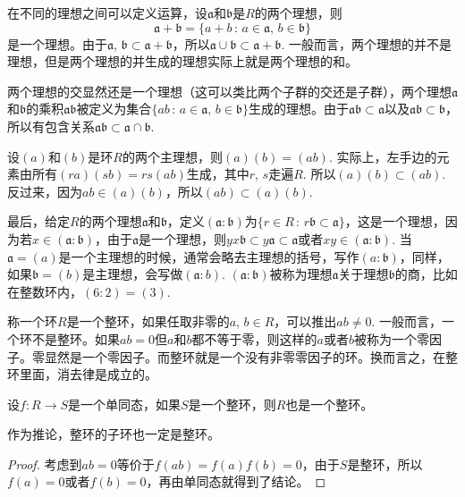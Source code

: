 \para[理想的运算] 在不同的理想之间可以定义运算，设$\mathfrak{a}$和$\mathfrak{b}$是$R$的两个理想，则
\[
\mathfrak{a}+\mathfrak{b}=\{a+b\,:\,a\in\mathfrak{a},\,b\in\mathfrak{b}\}
\]
是一个理想。由于$\mathfrak{a}$, $\mathfrak{b}\subset \mathfrak{a}+\mathfrak{b}$，所以$\mathfrak{a}\cup\mathfrak{b}\subset \mathfrak{a}+\mathfrak{b}$. 一般而言，两个理想的并不是理想，但是两个理想的并生成的理想实际上就是两个理想的和。

两个理想的交显然还是一个理想（这可以类比两个子群的交还是子群），两个理想$\mathfrak{a}$和$\mathfrak{b}$的乘积$\mathfrak{a}\mathfrak{b}$被定义为集合$\{ab\,:\,a\in\mathfrak{a},\,b\in\mathfrak{b}\}$生成的理想。由于$\mathfrak{a}\mathfrak{b}\subset \mathfrak{a}$以及$\mathfrak{a}\mathfrak{b}\subset \mathfrak{b}$，所以有包含关系$\mathfrak{a}\mathfrak{b}\subset \mathfrak{a}\cap \mathfrak{b}$.

设$(a)$和$(b)$是环$R$的两个主理想，则$(a)(b)=(ab)$. 实际上，左手边的元素由所有$(ra)(sb)=rs(ab)$生成，其中$r$, $s$走遍$R$. 所以$(a)(b)\subset (ab)$. 反过来，因为$ab\in (a)(b)$，所以$(ab)\subset (a)(b)$.

最后，给定$R$的两个理想$\mathfrak{a}$和$\mathfrak{b}$，定义$(\mathfrak{a}:\mathfrak{b})$为$\{r\in R\,:\, r\mathfrak{b}\subset \mathfrak{a}\}$，这是一个理想，因为若$x\in (\mathfrak{a}:\mathfrak{b})$，由于$\mathfrak{a}$是一个理想，则$yx\mathfrak{b}\subset y\mathfrak{a}\subset \mathfrak{a}$或者$xy\in (\mathfrak{a}:\mathfrak{b})$. 当$\mathfrak{a}=(a)$是一个主理想的时候，通常会略去主理想的括号，写作$(a:\mathfrak{b})$，同样，如果$\mathfrak{b}=(b)$是主理想，会写做$(\mathfrak{a}:b)$. $(\mathfrak{a}:\mathfrak{b})$被称为理想$\mathfrak{a}$关于理想$\mathfrak{b}$的商，比如在整数环内，$(6:2)=(3)$.
\endpara

\para 称一个环$R$是一个整环，如果任取非零的$a$, $b\in R$，可以推出$ab\neq 0$. 一般而言，一个环不是整环。如果$ab=0$但$a$和$b$都不等于零，则这样的$a$或者$b$被称为一个零因子。零显然是一个零因子。而整环就是一个没有非零零因子的环。换而言之，在整环里面，消去律是成立的。\endpara

\begin{lem}
	设$f:R\to S$是一个单同态，如果$S$是一个整环，则$R$也是一个整环。
\end{lem}

作为推论，整环的子环也一定是整环。

\begin{proof}
	考虑到$ab=0$等价于$f(ab)=f(a)f(b)=0$，由于$S$是整环，所以$f(a)=0$或者$f(b)=0$，再由单同态就得到了结论。
\end{proof}

